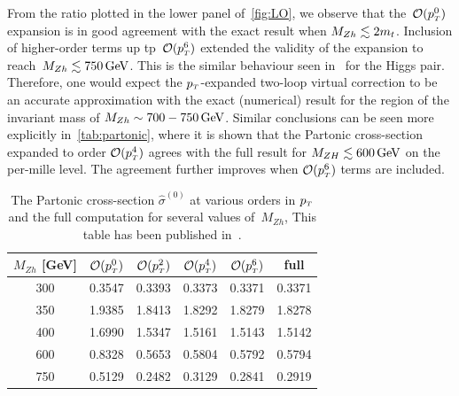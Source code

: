 From the ratio plotted in the lower panel of~\autoref{fig:LO}, we observe that the~$\mathcal{O}(p_{\scriptscriptstyle T}^0)$ expansion is in good agreement with the exact result when $M_{Zh}\lesssim 2m_t$. Inclusion of higher-order terms up tp~$\mathcal{O}(p_{\scriptscriptstyle T}^6)$ extended the validity of the expansion to reach~$M_{Zh}\lesssim 750\,\textrm{GeV}$. This is the similar behaviour seen in~\cite{Bonciani:2018omm} for the Higgs pair.  Therefore, one would expect the $p_{\scriptscriptstyle T}$-expanded two-loop virtual correction to be an accurate approximation with the exact (numerical) result for the region of the invariant mass of  $M_{Zh}\sim 700-750\,\textrm{GeV}$. 
Similar conclusions can be seen more explicitly in~\autoref{tab:partonic}, where it is shown that the Partonic cross-section
expanded to order $\mathcal{O}(p_{\scriptscriptstyle T}^4)$ agrees with the full result for
$M_{ZH} \lesssim 600 \,\textrm{GeV}$  on the per-mille level.
The agreement further improves when $\mathcal{O}(p_{\scriptscriptstyle T}^6)$ terms are included.
\begin{table}
	\renewcommand{\arraystretch}{1.2}
	\centering
	\begin{tabular}{| c| c | c | c| c| c|} \hline
		\rowcolor{lightgray}  $M_{Zh}$ [GeV]  & $\mathcal{O}(p_{\scriptscriptstyle T}^0)$ & $\mathcal{O}(p_{\scriptscriptstyle T}^2)$ & $\mathcal{O}(p_{\scriptscriptstyle T}^4)$ & $\mathcal{O}(p_{\scriptscriptstyle T}^6)$ & full \\ \hline 
		\cellcolor{lightgray} 300 & 0.3547 & 0.3393 &  0.3373 &0.3371& 0.3371 \\
		\cellcolor{lightgray} 350 & 1.9385 & 1.8413& 1.8292 &1.8279& 1.8278 \\
		\cellcolor{lightgray} 400 & 1.6990 & 1.5347 & 1.5161 &1.5143& 1.5142 \\
		\cellcolor{lightgray} 600 & 0.8328 & 0.5653 & 0.5804 &0.5792&  0.5794 \\ 
		\cellcolor{lightgray} 750 & 0.5129 & 0.2482 & 0.3129 & 0.2841 &  0.2919 \\ \hline
	\end{tabular}
	\caption{The Partonic cross-section $\hat{\sigma}^{(0)}$ at
		various orders in $p_{\scriptscriptstyle T}$ and the full computation for several values of~$M_{Zh}$, This table has been published in~\cite{Alasfar:2021ppe}. \label{tab:partonic}}
\end{table}
